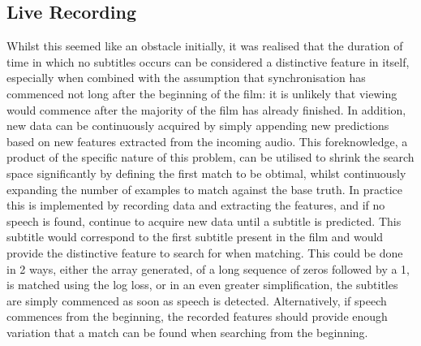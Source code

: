 \subsection{Live Recording}
Whilst this seemed like an obstacle initially, it was realised that the duration of time in which no subtitles occurs can be considered a distinctive feature in itself, especially when combined with the assumption that synchronisation has commenced not long after the beginning of the film: it is unlikely that viewing would commence after the majority of the film has already finished. In addition, new data can be continuously acquired by simply appending new predictions based on new features extracted from the incoming audio. This foreknowledge, a product of the specific nature of this problem, can be utilised to shrink the search space significantly by defining the first match to be obtimal, whilst continuously expanding the number of examples to match against the base truth. In practice this is implemented by recording data and extracting the features, and if no speech is found, continue to acquire new data until a subtitle is predicted. This subtitle would correspond to the first subtitle present in the film and would provide the distinctive feature to search for when matching. This could be done in 2 ways, either the array generated, of a long sequence of zeros followed by a 1, is matched using the log loss, or in an even greater simplification, the subtitles are simply commenced as soon as speech is detected. Alternatively, if speech commences from the beginning, the recorded features should provide enough variation that a match can be found when searching from the beginning.